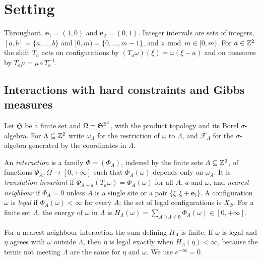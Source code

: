 \section{Setting}\label{sec:setting}

Throughout, $\mathbf e_1=(1,0)$ and $\mathbf e_2=(0,1)$. Integer intervals are sets of integers, $[a,b]=\{a,\dots,b\}$ and $[0,m)=\{0,\dots,m-1\}$, and $z\bmod m\in[0,m)$. For $a\in\mathbb{Z}^2$ the shift $T_a$ acts on configurations by $(T_a\omega)(\xi)=\omega(\xi-a)$ and on measures by $T_a\mu=\mu\circ T_a^{-1}$.

\subsection{Interactions with hard constraints and Gibbs measures}

Let $\mathfrak S$ be a finite set and $\Omega=\mathfrak S^{\mathbb{Z}^2}$, with the product topology and its Borel $\sigma$-algebra. For $\Lambda\subseteq\mathbb{Z}^2$ write $\omega_\Lambda$ for the restriction of $\omega$ to $\Lambda$, and $\mathcal F_{\Lambda}$ for the $\sigma$-algebra generated by the coordinates in $\Lambda$.

\begin{definition}[Interactions]\label{set:def-interaction}
An \emph{interaction} is a family $\Phi=(\Phi_A)$, indexed by the finite sets $A\subseteq\mathbb{Z}^2$, of functions $\Phi_A\colon\Omega\to[0,+\infty]$ such that $\Phi_A(\omega)$ depends only on $\omega_A$. It is \emph{translation invariant} if $\Phi_{A+a}(T_a\omega)=\Phi_A(\omega)$ for all $A$, $a$ and $\omega$, and \emph{nearest-neighbour} if $\Phi_A=0$ unless $A$ is a single site or a pair $\{\xi,\xi+\mathbf e_i\}$. A configuration $\omega$ is \emph{legal} if $\Phi_A(\omega)<\infty$ for every $A$; the set of legal configurations is $X_\Phi$. For a finite set $\Lambda$, the energy of $\omega$ in $\Lambda$ is $H_\Lambda(\omega)=\sum_{A\cap\Lambda\ne\emptyset}\Phi_A(\omega)\in[0,+\infty]$.
\end{definition}

For a nearest-neighbour interaction the sum defining $H_\Lambda$ is finite. If $\omega$ is legal and $\eta$ agrees with $\omega$ outside $\Lambda$, then $\eta$ is legal exactly when $H_\Lambda(\eta)<\infty$, because the terms not meeting $\Lambda$ are the same for $\eta$ and $\omega$. We use $e^{-\infty}=0$.

